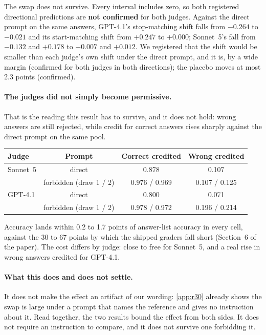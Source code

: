 \noindent The swap does not survive. Every interval includes zero, so both registered directional predictions
are \textbf{not confirmed} for both judges. Against the direct prompt on the same answers, GPT-4.1's
stop-matching shift falls from $-0.264$ to $-0.021$ and its start-matching shift from $+0.247$ to $+0.000$;
Sonnet~5's fall from $-0.132$ and $+0.178$ to $-0.007$ and $+0.012$. We registered that the shift would be
smaller than each judge's own shift under the direct prompt, and it is, by a wide margin (confirmed for both
judges in both directions); the placebo moves at most 2.3 points (confirmed).

\paragraph{The judges did not simply become permissive.} That is the reading this result has to survive, and
it does not hold: wrong answers are still rejected, while credit for correct answers rises sharply against
the direct prompt on the same pool.

\begin{center}\footnotesize
\begin{tabular}{lccc}
\toprule
Judge & Prompt & Correct credited & Wrong credited \\
\midrule
Sonnet~5 & direct & 0.878 & 0.107 \\
 & forbidden (draw 1 / 2) & 0.976 / 0.969 & 0.107 / 0.125 \\
\addlinespace[2pt]
GPT-4.1 & direct & 0.800 & 0.071 \\
 & forbidden (draw 1 / 2) & 0.978 / 0.972 & 0.196 / 0.214 \\
\bottomrule
\end{tabular}
\end{center}

\noindent Accuracy lands within 0.2 to 1.7 points of answer-list accuracy in every cell, against the 30 to 67
points by which the shipped graders fall short (Section~6 of the paper). The cost differs by judge: close to
free for Sonnet~5, and a real rise in wrong answers credited for GPT-4.1.

\paragraph{What this does and does not settle.} It does not make the effect an artifact of our wording:
\cref{app:r30} already shows the swap is large under a prompt that names the reference and gives no
instruction about it. Read together, the two results bound the effect from both sides. It does not require an
instruction to compare, and it does not survive one forbidding it.

